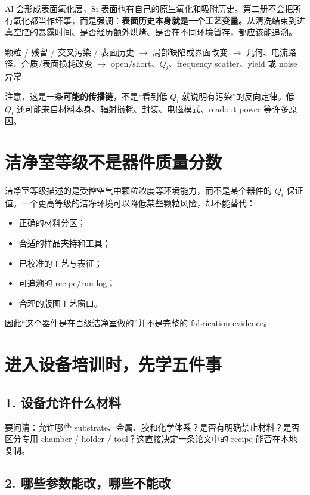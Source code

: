 Al 会形成表面氧化层，Si 表面也有自己的原生氧化和吸附历史。第二册不会把所有氧化都当作坏事，而是强调：\textbf{表面历史本身就是一个工艺变量。}从清洗结束到进真空腔的暴露时间、是否经历额外烘烤、是否在不同环境暂存，都应该能追溯。

\begin{processbox}
颗粒 / 残留 / 交叉污染 / 表面历史
$\rightarrow$
局部缺陷或界面改变
$\rightarrow$
几何、电流路径、介质/表面损耗改变
$\rightarrow$
open/short、$Q_i$、frequency scatter、yield 或 noise 异常
\end{processbox}

注意，这是一条\textbf{可能的传播链}，不是“看到低 $Q_i$ 就说明有污染”的反向定律。低 $Q_i$ 还可能来自材料本身、辐射损耗、封装、电磁模式、readout power 等许多原因。

\section{洁净室等级不是器件质量分数}

洁净室等级描述的是受控空气中颗粒浓度等环境能力，而不是某个器件的 $Q_i$ 保证值。一个更高等级的洁净环境可以降低某些颗粒风险，却不能替代：

\begin{itemize}
  \item 正确的材料分区；
  \item 合适的样品夹持和工具；
  \item 已校准的工艺与表征；
  \item 可追溯的 recipe/run log；
  \item 合理的版图工艺窗口。
\end{itemize}

因此“这个器件是在百级洁净室做的”并不是完整的 fabrication evidence。

\section{进入设备培训时，先学五件事}

\subsection{1. 设备允许什么材料}

要问清：允许哪些 substrate、金属、胶和化学体系？是否有明确禁止材料？是否区分专用 chamber / holder / tool？这直接决定一条论文中的 recipe 能否在本地复制。

\subsection{2. 哪些参数能改，哪些不能改}

